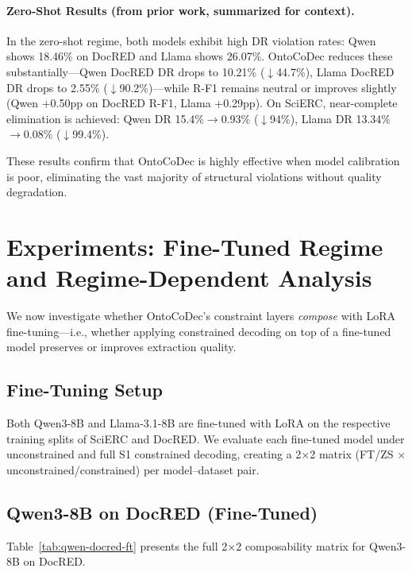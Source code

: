 \documentclass[11pt,a4paper]{article}
\newcommand{\system}{OntoCoDec}
\begin{document}
\paragraph{Zero-Shot Results (from prior work, summarized for context).}
In the zero-shot regime, both models exhibit high DR violation rates: Qwen shows 18.46\% on DocRED and Llama shows 26.07\%. \system{} reduces these substantially---Qwen DocRED DR drops to 10.21\% ($\downarrow$44.7\%), Llama DocRED DR drops to 2.55\% ($\downarrow$90.2\%)---while R-F1 remains neutral or improves slightly (Qwen +0.50pp on DocRED R-F1, Llama +0.29pp). On SciERC, near-complete elimination is achieved: Qwen DR 15.4\%$\to$0.93\% ($\downarrow$94\%), Llama DR 13.34\%$\to$0.08\% ($\downarrow$99.4\%).

These results confirm that \system{} is highly effective when model calibration is poor, eliminating the vast majority of structural violations without quality degradation.

\section{Experiments: Fine-Tuned Regime and Regime-Dependent Analysis}
\label{sec:ft}

We now investigate whether \system{}'s constraint layers \emph{compose} with LoRA fine-tuning---i.e., whether applying constrained decoding on top of a fine-tuned model preserves or improves extraction quality.

\subsection{Fine-Tuning Setup}

Both Qwen3-8B and Llama-3.1-8B are fine-tuned with LoRA on the respective training splits of SciERC and DocRED. We evaluate each fine-tuned model under unconstrained and full S1 constrained decoding, creating a 2$\times$2 matrix (FT/ZS $\times$ unconstrained/constrained) per model--dataset pair.

\subsection{Qwen3-8B on DocRED (Fine-Tuned)}

Table~\ref{tab:qwen-docred-ft} presents the full 2$\times$2 composability matrix for Qwen3-8B on DocRED.
\end{document}
